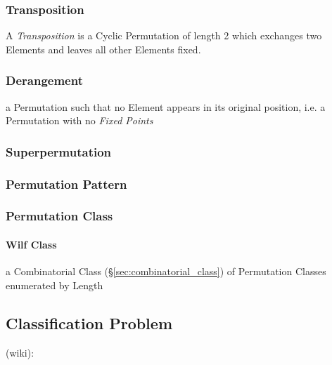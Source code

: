 \subsubsection{Transposition}\label{sec:transposition}

A \emph{Transposition} is a Cyclic Permutation of length 2 which exchanges two
Elements and leaves all other Elements fixed.



\subsubsection{Derangement}\label{sec:derangement}

a Permutation such that no Element appears in its original position, i.e. a
Permutation with no \emph{Fixed Points}



\subsubsection{Superpermutation}\label{sec:superpermutation}

\subsubsection{Permutation Pattern}\label{sec:permutation_pattern}

\subsubsection{Permutation Class}\label{sec:permutation_class}

\paragraph{Wilf Class}\label{sec:wilf_class}\hfill

a Combinatorial Class (\S\ref{sec:combinatorial_class}) of Permutation Classes
enumerated by Length



\subsection{Classification Problem}\label{sec:classification_problem}

(wiki):

